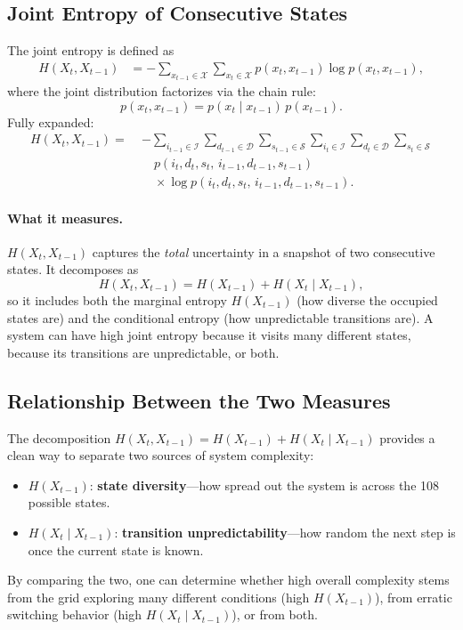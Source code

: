 \documentclass[11pt]{article}
\begin{document}
\subsection{Joint Entropy of Consecutive States}

The joint entropy is defined as
\[
\begin{aligned}
    H(X_t, X_{t-1})
    &= -\sum_{x_{t-1} \in \mathcal{X}}
        \sum_{x_t \in \mathcal{X}}
        p(x_t, x_{t-1})
        \log p(x_t, x_{t-1}),
\end{aligned}
\]
where the joint distribution factorizes via the chain rule:
\[
    p(x_t, x_{t-1}) = p(x_t \mid x_{t-1})\, p(x_{t-1}).
\]
Fully expanded:
\[
\begin{aligned}
    H(X_t, X_{t-1})
    = \; & -\sum_{i_{t-1} \in \mathcal{I}}
            \sum_{d_{t-1} \in \mathcal{D}}
            \sum_{s_{t-1} \in \mathcal{S}}
            \sum_{i_t \in \mathcal{I}}
            \sum_{d_t \in \mathcal{D}}
            \sum_{s_t \in \mathcal{S}} \\
         & \quad p(i_t, d_t, s_t,\, i_{t-1}, d_{t-1}, s_{t-1})\\
         & \quad\times
            \log p(i_t, d_t, s_t,\, i_{t-1}, d_{t-1}, s_{t-1}).
\end{aligned}
\]

\paragraph{What it measures.}
$H(X_t, X_{t-1})$ captures the \emph{total} uncertainty in a snapshot of two consecutive states. It decomposes as
\[
    H(X_t, X_{t-1}) = H(X_{t-1}) + H(X_t \mid X_{t-1}),
\]
so it includes both the marginal entropy $H(X_{t-1})$ (how diverse the occupied states are) and the conditional entropy (how unpredictable transitions are). A system can have high joint entropy because it visits many different states, because its transitions are unpredictable, or both.

\subsection{Relationship Between the Two Measures}

The decomposition $H(X_t, X_{t-1}) = H(X_{t-1}) + H(X_t \mid X_{t-1})$ provides a clean way to separate two sources of system complexity:
\begin{itemize}
    \item $H(X_{t-1})$: \textbf{state diversity}---how spread out the system is across the 108 possible states.
    \item $H(X_t \mid X_{t-1})$: \textbf{transition unpredictability}---how random the next step is once the current state is known.
\end{itemize}
By comparing the two, one can determine whether high overall complexity stems from the grid exploring many different conditions (high $H(X_{t-1})$), from erratic switching behavior (high $H(X_t \mid X_{t-1})$), or from both.
\end{document}
